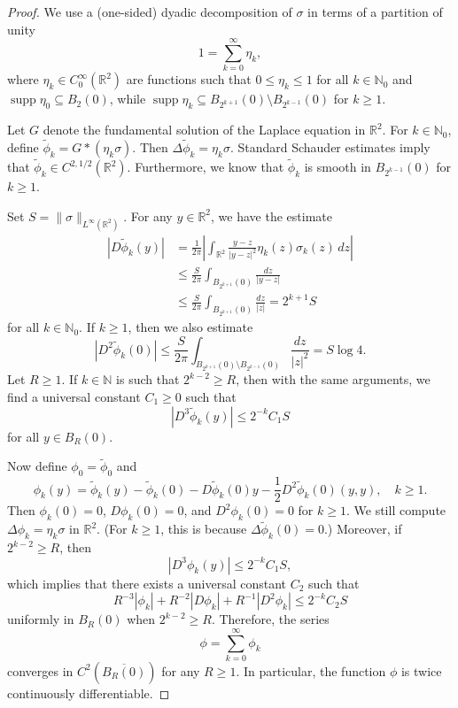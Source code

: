 \documentclass[a4paper]{article}
\newcommand{\R}{\mathbb{R}}
\newcommand{\N}{\mathbb{N}}
\DeclareMathOperator{\supp}{supp}
\theoremstyle{definition}
\theoremstyle{remark}
\begin{document}
\begin{proof}
We use a (one-sided) dyadic decomposition of $\sigma$ in terms of a partition of unity
\[
1 = \sum_{k = 0}^\infty \eta_k,
\]
where $\eta_k \in C_0^\infty(\R^2)$ are functions such that $0 \le \eta_k \le 1$
for all $k \in \N_0$ and $\supp \eta_0 \subseteq B_2(0)$, while
$\supp \eta_k \subseteq B_{2^{k + 1}}(0) \setminus B_{2^{k - 1}}(0)$ for
$k \ge 1$.

Let $G$ denote the fundamental solution of the Laplace equation in $\R^2$.
For $k \in \N_0$, define $\tilde{\phi}_k = G * (\eta_k \sigma)$. Then
$\Delta \tilde{\phi}_k = \eta_k \sigma$. Standard Schauder estimates imply
that $\tilde{\phi}_k \in C^{2, 1/2}(\R^2)$. Furthermore, we know that $\tilde{\phi}_k$ is
smooth in $B_{2^{k - 1}}(0)$ for $k \ge 1$.

Set $S = \|\sigma\|_{L^\infty(\R^2)}$.
For any $y \in \R^2$, we have the estimate
\[
\begin{split}
|D\tilde{\phi}_k(y)| & = \frac{1}{2\pi} \left|\int_{\R^2} \frac{y - z}{|y - z|^2} \eta_k(z) \sigma_k(z) \, dz\right| \\
& \le \frac{S}{2\pi} \int_{B_{2^{k + 1}}(0)} \frac{dz}{|y - z|} \\
& \le \frac{S}{2\pi} \int_{B_{2^{k + 1}}(0)} \frac{dz}{|z|} = 2^{k + 1} S
\end{split}
\]
for all $k \in \N_0$. If $k \ge 1$, then we also estimate
\[
|D^2 \tilde{\phi}_k(0)| \le \frac{S}{2\pi} \int_{B_{2^{k + 1}}(0) \setminus B_{2^{k - 1}}(0)} \frac{dz}{|z|^2} = S \log 4.
\]
Let $R \ge 1$. If $k \in \N$ is such that $2^{k - 2} \ge R$, then with the
same arguments, we find a universal constant $C_1 \ge 0$ such that
\[
|D^3 \tilde{\phi}_k(y)| \le 2^{-k} C_1S
\]
for all $y \in B_R(0)$.

Now define $\phi_0 = \tilde{\phi}_0$ and
\[
\phi_k(y) = \tilde{\phi}_k(y) - \tilde{\phi}_k(0) - D\tilde{\phi}_k(0)y - \frac{1}{2} D^2\tilde{\phi}_k(0)(y, y), \quad k \ge 1.
\]
Then $\phi_k(0) = 0$, $D\phi_k(0) = 0$, and $D^2\phi_k(0) = 0$ for $k \ge 1$.
We still compute $\Delta \phi_k = \eta_k \sigma$ in $\R^2$. (For $k \ge 1$,
this is because $\Delta \tilde{\phi}_k(0) = 0$.) Moreover, if
$2^{k - 2} \ge R$, then
\[
|D^3 \phi_k(y)| \le 2^{-k} C_1S,
\]
which implies that there exists a universal constant $C_2$ such that
\[
R^{-3} |\phi_k| + R^{-2} |D\phi_k| + R^{-1} |D^2\phi_k| \le 2^{-k} C_2 S
\]
uniformly in $B_R(0)$ when $2^{k - 2} \ge R$. Therefore, the series
\[
\phi = \sum_{k = 0}^\infty \phi_k
\]
converges in $C^2(\overline{B_R(0)})$ for any $R \ge 1$. In particular,
the function $\phi$ is twice continuously differentiable.


\end{proof}
\end{document}
